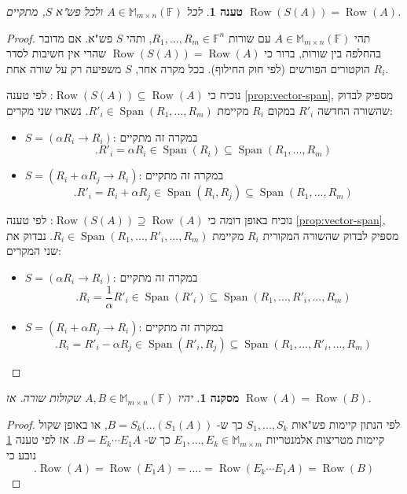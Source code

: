 \documentclass[12pt]{report}
\theoremstyle{plain}
\newtheorem{proposition}[theorem]{טענה}
\newtheorem{corollary}[theorem]{מסקנה}
\theoremstyle{definition}
\newcommand{\F}{\mathbb{F}}
\newcommand{\M}{\mathbb{M}}
\newcommand{\0}{\mathbf{0}}
\DeclareMathOperator{\Span}{Span}
\DeclareMathOperator{\Row}{Row}
\begin{document}
\begin{proposition}\label{prop:row-space-invariance}
לכל
$A\in\M_{m\times n}(\F)$
ולכל פש"א
$S$,
מתקיים
$\Row(S(A))=\Row(A)$.
\end{proposition}

\begin{proof}
תהי
$A\in\M_{m\times n}(\F)$
עם שורות
$R_1,...,R_m\in\F^n$,
ותהי
$S$
פש"א. אם מדובר בהחלפה בין שורות, ברור כי
$\Row(S(A))=\Row(A)$
שהרי אין חשיבות לסדר הוקטורים הפורשים (לפי חוק החילוף). בכל מקרה אחר, 
$S$
משפיעה רק על שורה אחת
$R_i$.

נוכיח כי
$\Row(S(A))\subseteq \Row(A)$:
לפי טענה 
\ref{prop:vector-span},
מספיק לבדוק שהשורה החדשה 
$R'_i$
במקום 
$R_i$
מקיימת
$R'_i\in\Span(R_1,...,R_m)$. 
נשארו שני מקרים:

\begin{itemize}
\item 
$S=(\alpha R_i\to R_i)$:
במקרה זה מתקיים
$$
.R'_i=\alpha R_i\in\Span(R_i)\subseteq\Span(R_1,...,R_m)
$$


\item 
$S=(R_i+\alpha R_j\to R_i)$:
במקרה זה מתקיים
$$
.R'_i=R_i+\alpha R_j\in\Span(R_i,R_j)\subseteq\Span(R_1,...,R_m)
$$


\end{itemize}

נוכיח באופן דומה כי
$\Row(S(A))\supseteq \Row(A)$:
לפי טענה 
\ref{prop:vector-span},
מספיק לבדוק שהשורה המקורית 
$R_i$
מקיימת
$R_i\in\Span(R_1,...,R'_i,...,R_m)$. 
נבדוק את שני המקרים:

\begin{itemize}
\item 
$S=(\alpha R_i\to R_i)$:
במקרה זה מתקיים
$$
.R_i=\frac{1}{\alpha} R'_i\in\Span(R'_i)\subseteq\Span(R_1,...,R'_i,...,R_m)
$$


\item 
$S=(R_i+\alpha R_j\to R_i)$:
במקרה זה מתקיים
$$
.R_i=R'_i-\alpha R_j\in\Span(R'_i,R_j)\subseteq\Span(R_1,...,R'_i,...,R_m)
$$


\end{itemize}
\end{proof}

\begin{corollary}\label{cor:row-equivalence}
יהיו
$A,B\in\M_{m\times n}(\F)$
שקולות שורה. אז 
$\Row(A)=\Row(B)$.
\end{corollary}

\begin{proof}
לפי הנתון קיימות פש"אות
$S_1,...,S_k$
כך ש-
$B=S_k(...(S_1(A))$,
או באופן שקול קיימות מטריצות אלמנטריות
$E_1,...,E_k\in\M_{m\times m}$
כך ש-
$B=E_k\cdots E_1A$.
אז לפי טענה
\ref{prop:row-space-invariance}
נובע כי
$$
.\Row(A)=\Row(E_1A)=....=\Row(E_k\cdots E_1A)=\Row(B)
$$
\end{proof}
\end{document}
